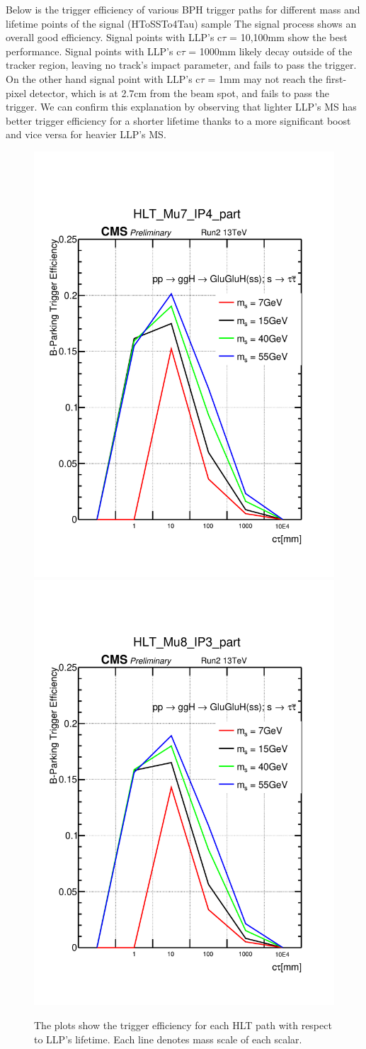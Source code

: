 Below is the trigger efficiency of various BPH trigger paths for different mass and lifetime points of the signal (HToSSTo4Tau) sample
The signal process shows an overall good efficiency.
Signal points with LLP's c$\tau$ = 10,100mm show the best performance.
Signal points with LLP's c$\tau$ = 1000mm likely decay outside of the tracker region, leaving no track's impact parameter, and fails to pass the trigger.
On the other hand signal point with LLP's c$\tau$ = 1mm may not reach the first-pixel detector, which is at 2.7cm from the beam spot, and fails to pass the trigger.
We can confirm this explanation by observing that lighter LLP's MS has better trigger efficiency for a shorter lifetime thanks to a more significant boost and vice versa for heavier LLP's MS.
\begin{figure}[h!]
  \caption{The plots show the trigger efficiency for each HLT path with respect to LLP's lifetime. Each line denotes mass scale of each scalar.}
  \label{fig:Trigger Efficiency}
  \centering
  \includegraphics[width=0.47\linewidth]{figs/TrigEff_HLT_Mu7_IP4_part.pdf}
  \includegraphics[width=0.47\linewidth]{figs/TrigEff_HLT_Mu8_IP3_part.pdf}

\end{figure}
